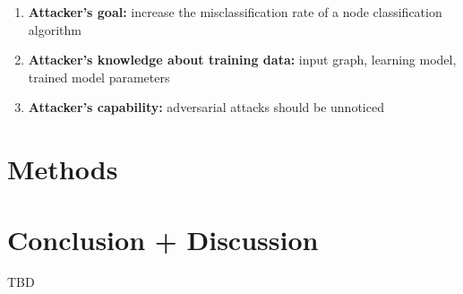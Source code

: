 \documentclass[a4paper,preprint]{sig-alternate}
\begin{document}
\begin{enumerate}
    \item \textbf{Attacker's goal:} increase the misclassification rate of a node classification algorithm
    \item \textbf{Attacker's knowledge about training data:} input graph, learning model, trained model parameters
    \item \textbf{Attacker's capability:} adversarial attacks should be unnoticed 
\end{enumerate}

\section{Methods}

\pagebreak

\section{Conclusion + Discussion}
TBD

\pagebreak



\end{document}

